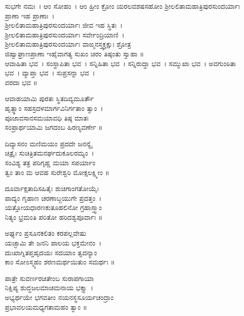 ಸುಭಗೇ ನಮಃ~। ಆಂ ಸೋಹಂ~। ಆಂ ಹ್ರೀಂ ಕ್ರೋಂ ಯರಲವಶಷಸಹೋಂ ಶ್ರೀಲಲಿತಾಮಹಾತ್ರಿಪುರಸುಂದರ್ಯಾಃ ಪ್ರಾಣಾ ಇಹ ಪ್ರಾಣಾಃ~।\\ ಶ್ರೀಲಲಿತಾಮಹಾತ್ರಿಪುರಸುಂದರ್ಯಾಃ ಜೀವ ಇಹ ಸ್ಥಿತಃ~।\\ ಶ್ರೀಲಲಿತಾಮಹಾತ್ರಿಪುರಸುಂದರ್ಯಾಃ ಸರ್ವೇಂದ್ರಿಯಾಣಿ~।\\ಶ್ರೀಲಲಿತಾಮಹಾತ್ರಿಪುರಸುಂದರ್ಯಾಃ ವಾಙ್ಮನಸ್ತ್ವಕ್ಚಕ್ಷುಃ ಶ್ರೋತ್ರ\\ಜಿಹ್ವಾಘ್ರಾಣಪ್ರಾಣಾ ಇಹೈವಾಗತ್ಯ ಸುಖಂ ಚಿರಂ ತಿಷ್ಠಂತು ಸ್ವಾಹಾ ॥\\ಆವಾಹಿತಾ ಭವ~। ಸಂಸ್ಥಾಪಿತಾ ಭವ~। ಸನ್ನಿಹಿತಾ ಭವ~। ಸನ್ನಿರುದ್ಧಾ ಭವ~। ಸಮ್ಮುಖಾ ಭವ~। ಅವಗುಂಠಿತಾ ಭವ~। ವ್ಯಾಪ್ತಾ ಭವ~। ಸುಪ್ರಸನ್ನಾ ಭವ~।\\ ವರದಾ ಭವ ॥


ಆವಾಹಯಾಮಿ ಪುರತಃ ಸ್ಥಿತದಿವ್ಯಮೂರ್ತೌ \\ಹೃತ್ಸ್ಥಾಂ ಸಹಸ್ರದಳಮಾರ್ಗವಿನಿರ್ಗತಾಂ ತ್ವಾಂ~।\\
ಪೂಜಾವಸಾನಸಮಯಾವಧಿ ತಿಷ್ಠ ಮಾತಃ \\ಸಂಪ್ರಾರ್ಥಯಾಮಿ ಜಗದಂಬ ಹಿರಣ್ಯವರ್ಣೇ ॥

ದಿವ್ಯಾಸನಂ ಮಣಿಮಯಂ ಪ್ರದದೇ ಜನನ್ಯೈ\\ ಚಿತ್ರೈಃ ಸುಚಿತ್ರಿತಮನರ್ಘದುಕೂಲರಮ್ಯಂ~।\\
ಸಂವಿಶ್ಯ ತತ್ರ ಪರಿಗೃಹ್ಣ ಮಯಾ ಸಪರ್ಯಾಂ\\ ತ್ವಂ ತಾಂ ಮ ಆವಹ ಸುರೇಶ್ವರಿ ಮೋಕ್ಷಲಕ್ಷ್ಮೀಂ ॥

ದೂರ್ವಾಕ್ಷತಾದಿಸಹಿತೈಃ ಶುಚಿಗಾಂಗತೋಯೈಃ\\ ಪಾದ್ಯಂ ಗೃಹಾಣ ಚರಣಾಬ್ಜಯುಗೇ ಪ್ರದತ್ತಂ~।\\
ಯತ್ತೋಯಧಾರಣಕುತೂಹಲಿನೋ ಗ್ರಹಾಸ್ತ್ವಾಂ \\ನಿತ್ಯಂ ಭ್ರಮಂತಿ ಪರಿತೋ ಹರಿದಶ್ವಪೂರ್ವಾಃ ॥

ಅರ್ಘ್ಯಂ ಪ್ರಸೂನಕಲಿತಂ ಕರಪಲ್ಲವೇಷು \\ಯಚ್ಛಾಮಿ ತೇ ಜನನಿ ಪಾಲಯ ಭಕ್ತಮೇನಂ~।\\
ದುಃಖಾಗ್ನಿತಪ್ತಹೃದಯಃ ಸದಯಾಂ ತ್ವದನ್ಯಾಂ\\ ಕಾಂ ಸೋಽಸ್ಮ್ಯಹಂ ಶರಣಮರ್ಥಯಿತುಂ ಸಮರ್ಥಃ ॥

ಪಾತ್ರೇ ಸುವರ್ಣರಚಿತೇಂಬ ಸುರಾಪಗಾಯಾ \\ನಿಕ್ಷಿಪ್ಯ ಶುದ್ಧಜಲಮಾಚಮನಾಯ ಭಕ್ತ್ಯಾ~।\\
ಅಭ್ಯರ್ಥಯೇ ಭಗವತೀಂ ನಯನಸ್ಥಸೂರ್ಯಚಂದ್ರಾಂ\\ ಪ್ರಭಾವಲಯಮಧ್ಯಗತಾಮಹಂ ತ್ವಾಂ ॥

